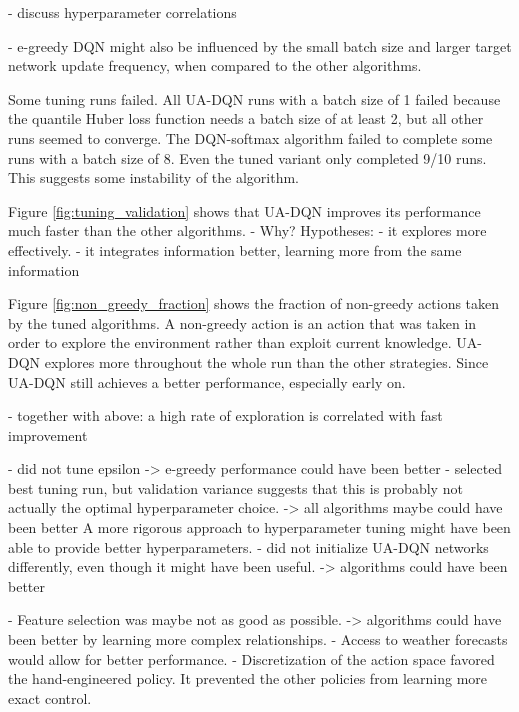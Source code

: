 - discuss hyperparameter correlations

- e-greedy DQN might also be influenced by the small batch size and larger target network update frequency, when compared to the other algorithms.

Some tuning runs failed. All UA-DQN runs with a batch size of 1 failed because the quantile Huber loss function needs a batch size of at least 2, but all other runs seemed to converge.
The DQN-softmax algorithm failed to complete some runs with a batch size of 8. Even the tuned variant only completed 9/10 runs. This suggests some instability of the algorithm. 

Figure \ref{fig:tuning_validation} shows that UA-DQN improves its performance much faster than the other algorithms.
- Why? Hypotheses:
  - it explores more effectively.
  - it integrates information better, learning more from the same information


Figure \ref{fig:non_greedy_fraction} shows the fraction of non-greedy actions taken by the tuned algorithms.
A non-greedy action is an action that was taken in order to explore the environment rather than exploit current knowledge.
UA-DQN explores more throughout the whole run than the other strategies.
Since UA-DQN still achieves a better performance, especially early on.

- together with above: a high rate of exploration is correlated with fast improvement


- did not tune epsilon -> e-greedy performance could have been better
- selected best tuning run, but validation variance suggests that this is probably not actually the optimal hyperparameter choice.  -> all algorithms maybe could have been better
  A more rigorous approach to hyperparameter tuning might have been able to provide better hyperparameters.
- did not initialize UA-DQN networks differently, even though it might have been useful. -> algorithms could have been better

- Feature selection was maybe not as good as possible. -> algorithms could have been better by learning more complex relationships.
  - Access to weather forecasts would allow for better performance.
  - Discretization of the action space favored the hand-engineered policy. It prevented the other policies from learning more exact control.






